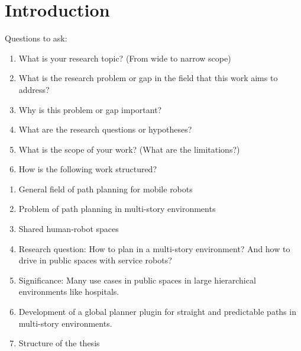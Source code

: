 \chapter{Introduction}
\label{sec:introduction}
Questions to ask:
\begin{enumerate}
    \item What is your research topic? (From wide to narrow scope)
    \item What is the research problem or gap in the field that this work aims to address?
    \item Why is this problem or gap important?
    \item What are the research questions or hypotheses? 
    \item What is the scope of your work? (What are the limitations?)
    \item How is the following work structured?
\end{enumerate}

\begin{enumerate}
    \item General field of path planning for mobile robots
    \item Problem of path planning in multi-story environments
    \item Shared human-robot spaces
    \item Research question: How to plan in a multi-story environment? And how to drive in public spaces with service robots?
    \item Significance: Many use cases in public spaces in large hierarchical environments like hospitals.
    \item Development of a global planner plugin for straight and predictable paths in multi-story environments.
    \item Structure of the thesis
\end{enumerate}

